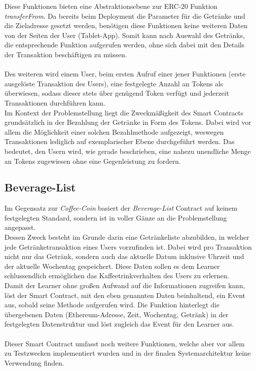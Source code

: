 Diese Funktionen bieten eine Abstraktionsebene zur ERC-20 Funktion \textit{transferFrom}. Da bereits beim Deployment die Parameter für die Getränke und die Zieladresse gesetzt werden, benötigen diese Funktionen keine weiteren Daten von der Seiten der User (Tablet-App). Somit kann nach Auswahl des Getränks, die entsprechende Funktion aufgerufen werden, ohne sich dabei mit den Details der Transaktion beschäftigen zu müssen.\\\\
Des weiteren wird einem User, beim ersten Aufruf einer jener Funktionen (erste ausgelöste Transaktion des Users), eine festgelegte Anzahl an Tokens als  überwiesen, sodass dieser stets über genügend Token verfügt und jederzeit Transaktionen durchführen kann.\\
Im Kontext der Problemstellung liegt die Zweckmäßigkeit des Smart Contracts grundsätzlich in der Bezahlung der Getränke in Form des Tokens. Dabei wird vor allem die Möglichkeit einer solchen Bezahlmethode aufgezeigt, weswegen Transaktionen lediglich auf exemplarischer Ebene durchgeführt werden. Das bedeutet, den Usern wird, wie gerade beschrieben, eine nahezu unendliche Menge an Tokens zugewiesen ohne eine Gegenleistung zu fordern.

\subsection{Beverage-List}
\label{subsec:bl}

Im Gegensatz zur \textit{Coffee-Coin} basiert der \textit{Beverage-List} Contract auf keinem festgelegten Standard, sondern ist in voller Gänze an die Problemstellung angepasst.\\
Dessen Zweck besteht im Grunde darin eine Getränkeliste abzubilden, in welcher jede Getränketransaktion eines Users vorzufinden ist. Dabei wird pro Transaktion nicht nur das Getränk, sondern auch das aktuelle Datum inklusive Uhrzeit und der aktuelle Wochentag gespeichert. Diese Daten sollen es dem Learner schlussendlich ermöglichen das Kaffeetrinkverhalten des Users zu erlernen. \\
Damit der Learner ohne großen Aufwand auf die Informationen zugreifen kann, löst der Smart Contract, mit den eben genannten Daten beinhaltend, ein Event aus, sobald seine Methode  aufgerufen wird. Die Funktion hinterlegt die übergebenen Daten (Ethereum-Adresse, Zeit, Wochentag, Getränk) in der festgelegten Datenstruktur und löst zugleich das Event für den Learner aus.\\\\
Dieser Smart Contract umfasst noch weitere Funktionen, welche aber vor allem zu Testzwecken implementiert wurden und in der finalen Systemarchitektur keine Verwendung finden. 

